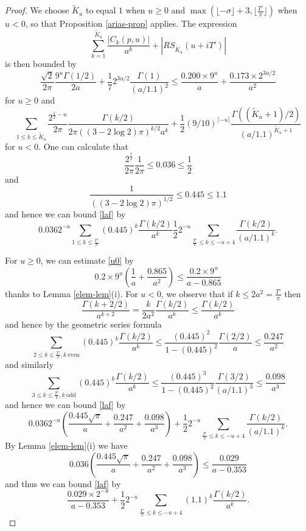 \documentclass[a4paper,11pt,twoside]{amsart}
\begin{document}
\begin{proof}
We choose $\tilde K_u$ to equal $1$ when $u \geq 0$ and $\max( \lfloor -\sigma \rfloor + 3, \lfloor \frac{T'}{\pi} \rfloor )$ when $u < 0$, so that Proposition \ref{arias-prop} applies.  The expression
$$ \sum_{k=1}^{\tilde K_u} \frac{|C_k(p,u)|}{a^k} + |RS_{\tilde K_u}(u + iT')| $$
is then bounded by
\begin{equation}\label{u0}
 \frac{\sqrt{2}}{2\pi} \frac{9^u \Gamma(1/2)}{2a} + \frac{1}{7} 2^{3u/2} \frac{\Gamma(1)}{(a/1.1)^2}
\leq \frac{0.200 \times 9^u}{a} + \frac{0.173 \times 2^{3u/2}}{a^2} 
\end{equation}
for $u \geq 0$ and
\begin{equation}\label{laf}
 \sum_{1 \leq k \leq \tilde K_u} \frac{2^{\frac{1}{2}-u}}{2\pi} \frac{\Gamma(k/2)}{2\pi ((3-2\log 2)\pi)^{k/2} a^k} + \frac{1}{2} (9/10)^{\lceil -u \rceil} \frac{\Gamma((\tilde K_u + 1)/2)}{(a/1.1)^{\tilde K_u + 1}}
\end{equation}
for $u < 0$.  One can calculate that
$$ \frac{2^{\frac{1}{2}}}{2\pi} \frac{1}{2\pi} \leq 0.036 \leq \frac{1}{2}$$
and
$$ \frac{1}{((3-2\log 2)\pi)^{1/2}} \leq 0.445 \leq 1.1$$
and hence we can bound \eqref{laf} by
$$  0.036 2^{-u} \sum_{1 \leq k \leq \frac{T'}{\pi}} (0.445)^k \frac{\Gamma(k/2)}{a^k} 
\frac{1}{2} 2^{-u} \sum_{\frac{T'}{\pi} \leq k \leq -u+4} \frac{\Gamma(k/2)}{(a/1.1)^k}.$$

For $u \geq 0$, we can estimate \eqref{u0} by
$$ 0.2 \times 9^u \left(\frac{1}{a} + \frac{0.865}{a^2}\right) \leq \frac{0.2 \times 9^u}{a - 0.865}$$
thanks to Lemma \ref{elem-lem}(i).  For $u<0$, we observe that if $k \leq 2 a^2 = \frac{T'}{\pi}$ then
$$ \frac{\Gamma(k+2/2)}{a^{k+2}} = \frac{k}{2 a^2} \frac{\Gamma(k/2)}{a^k} \leq \frac{\Gamma(k/2)}{a^k}$$
and hence by the geometric series formula
$$ \sum_{2 \leq k \leq \frac{T'}{\pi}, k\ \mathrm{even}} (0.445)^k \frac{\Gamma(k/2)}{a^k}  \leq \frac{(0.445)^2}{1-(0.445)^2} \frac{\Gamma(2/2)}{a} \leq \frac{0.247}{a^2}$$
and similarly
$$ \sum_{3 \leq k \leq \frac{T'}{\pi}, k\ \mathrm{odd}} (0.445)^k \frac{\Gamma(k/2)}{a^k}  \leq \frac{(0.445)^3}{1-(0.445)^2} \frac{\Gamma(3/2)}{(a/1.1)^3} \leq \frac{0.098}{a^3}$$
and hence we can bound \eqref{laf} by
$$ 0.036 2^{-u} \left(\frac{0.445 \sqrt{\pi}}{a} + \frac{0.247}{a^2} + \frac{0.098}{a^3}\right) + \frac{1}{2} 2^{-u}  \sum_{\frac{T'}{\pi} \leq k \leq -u+4} \frac{\Gamma(k/2)}{(a/1.1)^k}.$$
By Lemma \ref{elem-lem}(i) we have
$$ 0.036 \left(\frac{0.445 \sqrt{\pi}}{a} + \frac{0.247}{a^2} + \frac{0.098}{a^3}\right) \leq \frac{0.029}{a - 0.353}$$
and thus we can bound \eqref{laf} by
$$ \frac{0.029 \times 2^{-u}}{a - 0.353} + \frac{1}{2} 2^{-u} \sum_{\frac{T'}{\pi} \leq k \leq -u+4} (1.1)^{k} \frac{\Gamma(k/2)}{a^k}.$$


\end{proof}
\end{document}
